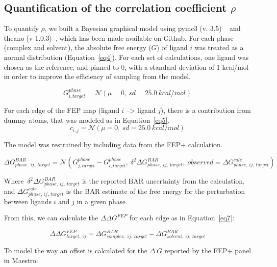 \documentclass[phd,tocprelim]{cornell}
\begin{document}
\subsection{Quantification of the correlation coefficient $\rho$}
 To quantify $\rho$, we built a Bayesian graphical model using pymc3 (v. 3.5) ~\citep{Salvatier:2016ki} and theano (v 1.0.3)~\citep{2016arXiv160502688full}, which has been made available on Github. For each phase (complex and solvent), the absolute free energy ($G$) of ligand $i$ was treated as a normal distribution (Equation~\ref{eq4}). For each set of calculations, one ligand was chosen as the reference, and pinned to 0, with a standard deviation of 1 kcal/mol in order to improve the efficiency of sampling from the model.
 
 \begin{equation}\label{eq4}
G^{phase}_{i,target} = \mathcal{N}(\mu=0,~sd=25.0~kcal/mol)
 \end{equation}
 
 For each edge of the FEP map (ligand $i$ --> ligand $j$), there is a contribution from dummy atoms, that was modeled as in Equation~\ref{eq5}.  
  \begin{equation}\label{eq5}
c_{i,j} = \mathcal{N}(\mu=0,~sd=25.0~kcal/mol)
 \end{equation}
 
 The model was restrained by including data from the FEP+ calculation. 
 
 \begin{equation}\label{eq6}
 \Delta G^{BAR}_{phase, ~ij, ~target} = \mathcal{N}(G^{phase}_{j, target} - G^{phase}_{i, target},~\delta^2\Delta G^{BAR}_{phase, ~ij, ~target}, ~observed = \Delta G^{calc}_{phase,~ij,~target})
 \end{equation}
 
 Where $~\delta^2\Delta G^{BAR}_{phase, ~ij, ~target}$ is the reported BAR uncertainty from the calculation, and $\Delta G^{calc}_{phase,~ij,~target}$ is the BAR estimate of the free energy for the perturbation between ligands $i$ and $j$ in a given phase. 
 
 From this, we can calculate the $\Delta \Delta G^{FEP}$ for each edge as in Equation~\ref{eq7}:
 
 \begin{equation}\label{eq7}
 \Delta\Delta G^{FEP}_{target,~ij} = \Delta G^{BAR}_{complex,~ij,~target} - \Delta G^{BAR}_{solvent,~ij,~target}
 \end{equation}
 
 To model the way an offset is calculated for the $\Delta~G$ reported by the FEP+ panel in Maestro: 
 
\end{document}
